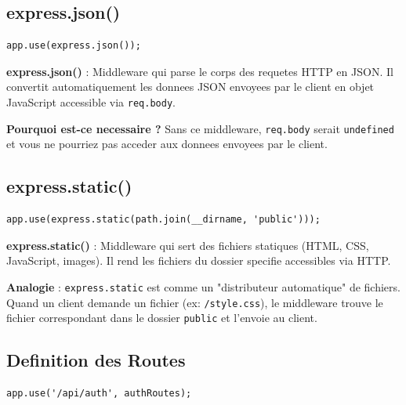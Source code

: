 \documentclass[a4paper,12pt]{book}
\begin{document}
\subsection{express.json()}

\begin{lstlisting}[style=javascript]
app.use(express.json());
\end{lstlisting}

\begin{definitionbox}
    \textbf{express.json()} : Middleware qui parse le corps des requetes HTTP en JSON. Il convertit automatiquement les donnees JSON envoyees par le client en objet JavaScript accessible via \texttt{req.body}.
\end{definitionbox}

\textbf{Pourquoi est-ce necessaire ?}
Sans ce middleware, \texttt{req.body} serait \texttt{undefined} et vous ne pourriez pas acceder aux donnees envoyees par le client.

\subsection{express.static()}

\begin{lstlisting}[style=javascript]
app.use(express.static(path.join(__dirname, 'public')));
\end{lstlisting}

\begin{definitionbox}
    \textbf{express.static()} : Middleware qui sert des fichiers statiques (HTML, CSS, JavaScript, images). Il rend les fichiers du dossier specifie accessibles via HTTP.
\end{definitionbox}

\begin{analogybox}
    \textbf{Analogie} : \texttt{express.static} est comme un "distributeur automatique" de fichiers. Quand un client demande un fichier (ex: \texttt{/style.css}), le middleware trouve le fichier correspondant dans le dossier \texttt{public} et l'envoie au client.
\end{analogybox}

\subsection{Definition des Routes}

\begin{lstlisting}[style=javascript]
app.use('/api/auth', authRoutes);
\end{lstlisting}
\end{document}
